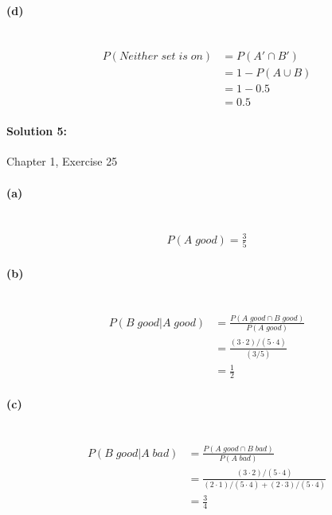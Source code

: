 \documentclass[a4paper]{article}
\begin{document}
\paragraph{(d)} ~\\
\begin{align*}
P(Neither \; set \; is \; on) &= P(A' \cap B') \\
                    &= 1 - P(A \cup B) \\
                    &= 1 - 0.5 \\
                    &= 0.5
\end{align*}

\paragraph{Solution 5:}
Chapter 1, Exercise 25

\paragraph{(a)} ~\\
\begin{align*}
P(A \; good) = \frac{3}{5}
\end{align*}

\paragraph{(b)} ~\\
\begin{align*}
P(B \; good | A \; good) &= \frac{P(A \; good \cap B \; good)}{P(A \; good)} \\
                         &= \frac{(3 \cdot 2)/(5 \cdot 4)}{(3 / 5)} \\
                         &= \frac{1}{2}
\end{align*}

\paragraph{(c)} ~\\
\begin{align*}
P(B \; good | A \; bad) &= \frac{P(A \; good \cap B \; bad)}{P(A \; bad)} \\
                        &= \frac{(3 \cdot 2)/(5 \cdot 4)}{(2 \cdot 1)/(5 \cdot 4) + (2 \cdot 3)/(5 \cdot 4)} \\
                        &= \frac{3}{4}
\end{align*}
\end{document}
